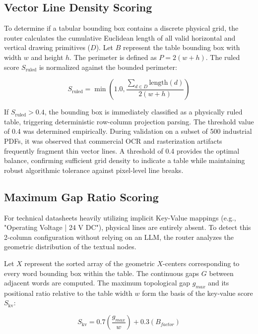 \subsection{Vector Line Density Scoring}
To determine if a tabular bounding box contains a discrete physical grid, the router calculates the cumulative Euclidean length of all valid horizontal and vertical drawing primitives ($D$). Let $B$ represent the table bounding box with width $w$ and height $h$. The perimeter is defined as $P = 2(w + h)$. The ruled score $S_{\text{ruled}}$ is normalized against the bounded perimeter:

\begin{equation}
S_{\text{ruled}} = \min \left( 1.0, \frac{\sum_{d \in D} \text{length}(d)}{2(w + h)} \right)
\end{equation}

If $S_{\text{ruled}} > 0.4$, the bounding box is immediately classified as a physically ruled table, triggering deterministic row-column projection parsing. The threshold value of 0.4 was determined empirically. During validation on a subset of 500 industrial PDFs, it was observed that commercial OCR and rasterization artifacts frequently fragment thin vector lines. A threshold of 0.4 provides the optimal balance, confirming sufficient grid density to indicate a table while maintaining robust algorithmic tolerance against pixel-level line breaks.

\subsection{Maximum Gap Ratio Scoring}
For technical datasheets heavily utilizing implicit Key-Value mappings (e.g., "Operating Voltage | 24 V DC"), physical lines are entirely absent. To detect this 2-column configuration without relying on an LLM, the router analyzes the geometric distribution of the textual nodes.

Let $X$ represent the sorted array of the geometric $X$-centers corresponding to every word bounding box within the table. The continuous gaps $G$ between adjacent words are computed. The maximum topological gap $g_{max}$ and its positional ratio relative to the table width $w$ form the basis of the key-value score $S_{\text{kv}}$:

\begin{equation}
S_{\text{kv}} = 0.7 \left( \frac{g_{max}}{w} \right) + 0.3 \left( B_{factor} \right)
\end{equation}

